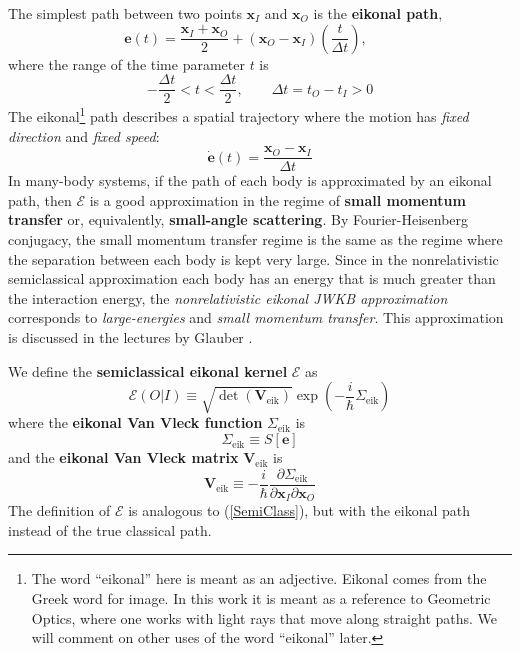 The simplest path between two points $\mathbf{x}_{I}$ and $\mathbf{x}_{O}$ is the \textbf{eikonal path},
\begin{equation}
	\mathbf{e}(t) = \frac{\mathbf{x}_{I} + \mathbf{x}_{O}}{2} + \left( \mathbf{x}_{O} - \mathbf{x}_{I} \right) \left( \frac{t}{\Delta t} \right), \qquad 
\end{equation}
where the range of the time parameter $t$ is
\begin{equation}
	{- \frac{\Delta t}{2} } < t < \frac{\Delta t}{2}, \qquad \Delta t = t_{O} - t_{I} > 0
\end{equation}
The eikonal\footnote{The word ``eikonal'' here is meant as an adjective. Eikonal comes from the Greek word for image. In this work it is meant as a reference to Geometric Optics, where one works with light rays that move along straight paths. We will comment on other uses of the word ``eikonal'' later.} path describes a spatial trajectory where the motion has \textit{fixed direction} and \textit{fixed speed}:
\begin{equation}
	\dot{\mathbf{e}}(t) = \frac{\mathbf{x}_{O} - \mathbf{x}_{I}}{\Delta t}
\end{equation}
In many-body systems, if the path of each body is approximated by an eikonal path, then $\mathcal{E}$ is a good approximation in the regime of \textbf{small momentum transfer} or, equivalently, \textbf{small-angle scattering}. By Fourier-Heisenberg conjugacy, the small momentum transfer regime is the same as the regime where the separation between each body is kept very large. Since in the nonrelativistic semiclassical approximation each body has an energy that is much greater than the interaction energy, the \textit{nonrelativistic eikonal JWKB approximation} corresponds to \textit{large-energies} and \textit{small momentum transfer}. This approximation is discussed in the lectures by Glauber \cite{Glauber}.

We define the \textbf{semiclassical eikonal kernel} $\mathcal{E}$ as
\begin{equation}
	\mathcal{E}(O|I) \equiv \sqrt{\det{(\mathbf{V}_{\text{eik}})}} \exp{\left(- \frac{i}{\hbar} \Sigma_{\text{eik}} \right)} \label{SemiClassEik}
\end{equation}
where the \textbf{eikonal Van Vleck function} $\Sigma_{\text{eik}}$ is
\begin{equation}
	\Sigma_{\text{eik}} \equiv S[ \mathbf{e} ]
\end{equation}
and the \textbf{eikonal Van Vleck matrix} $\mathbf{V}_{\text{eik}}$ is
\begin{equation}
	\mathbf{V}_{\text{eik}} \equiv - \frac{i}{\hbar} \frac{\partial \Sigma_{\text{eik}}}{\partial \mathbf{x}_{I} \partial \mathbf{x}_{O}}
\end{equation}
The definition of $\mathcal{E}$ is analogous to (\ref{SemiClass}), but with the eikonal path instead of the true classical path.
